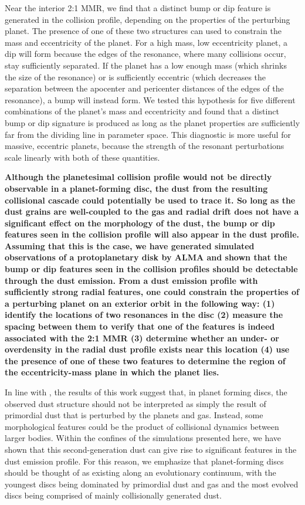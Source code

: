 \documentclass[fleqn,usenatbib]{mnras}
\begin{document}
Near the interior 2:1 MMR, we find that a distinct bump or dip feature is generated in the collision profile, depending on the properties of the perturbing 
planet. The presence of one of these two structures can used to constrain the mass and eccentricity of the planet. For a high mass, low eccentricity 
planet, a dip will form because the edges of the resonance, where many collisions occur, stay sufficiently separated. If the planet 
has a low enough mass (which shrinks the size of the resonance) or is sufficiently eccentric (which decreases the separation between the apocenter 
and pericenter distances of the edges of the resonance), a bump will instead form. We tested this hypothesis for five different combinations of the 
planet's mass and eccentricity and found that a distinct bump or dip signature is produced as long as the planet properties are sufficiently far from 
the dividing line in parameter space. This diagnostic is more useful for massive, eccentric planets, because the strength of the resonant 
perturbations scale linearly with both of these quantities.

\textbf{Although the planetesimal collision profile would not be directly observable in a planet-forming disc, the dust from the resulting collisional cascade could potentially be used to trace it. So long as the dust grains are well-coupled to the gas and radial drift does not have a significant effect on the morphology of the dust, the bump or dip features seen in the collision profile will also appear in the dust profile. Assuming that this is the case, we have generated simulated observations of a protoplanetary disk by ALMA and shown that the bump or dip features seen in the collision profiles should be detectable through the dust emission. From a dust emission profile with sufficiently strong radial features, one could constrain the properties of a perturbing planet on an exterior orbit in the following way: (1) identify the locations of two resonances in the disc (2) measure the spacing between them to verify that one of the features is indeed associated with the 2:1 MMR (3) determine whether an under- or overdensity in the radial dust profile exists near this location (4) use the presence of one of these two features to determine the region of the eccentricity-mass plane in which the planet lies.}

In line with \citet{2017ApJ...850..103B}, the results of this work suggest that, in planet forming discs, the observed dust structure should not be 
interpreted as simply the result of primordial dust that is perturbed by the planets and gas. Instead, some morphological features could be the product 
of collisional dynamics between larger bodies. Within the confines of the simulations presented here, we have shown that this second-generation dust 
can give rise to significant features in the dust emission profile. For this reason, we emphasize that planet-forming discs should be thought of as 
existing along an evolutionary continuum, with the youngest discs being dominated by primordial dust and gas and the most evolved discs being 
comprised of mainly collisionally generated dust.
\end{document}
